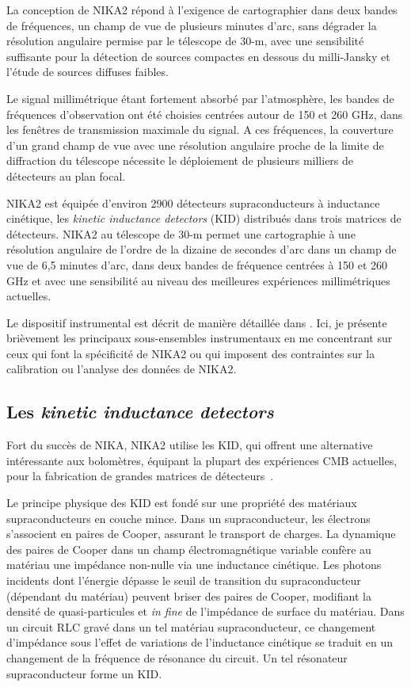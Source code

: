 La conception de NIKA2 répond à l'exigence de cartographier dans deux
bandes de fréquences, un champ de vue de plusieurs minutes d'arc, sans
dégrader la résolution angulaire permise par le télescope de 30-m,
avec une sensibilité suffisante pour la détection de sources compactes
en dessous du milli-Jansky et l'étude de sources diffuses faibles.

Le signal millimétrique étant fortement absorbé par l'atmosphère, les
bandes de fréquences d'observation ont été choisies centrées
autour de 150 et 260 GHz, dans les fenêtres de transmission maximale
du signal. A ces fréquences, la couverture d'un grand champ de vue
avec une résolution angulaire proche de la limite de diffraction du
télescope nécessite le déploiement de plusieurs milliers de détecteurs
au plan focal.

NIKA2 est équipée d'environ 2900 détecteurs supraconducteurs à inductance
cinétique, les \emph{kinetic inductance detectors} (KID) distribués
dans trois matrices de détecteurs. NIKA2 au télescope de 30-m permet
une cartographie à une résolution angulaire de l'ordre de la dizaine
de secondes d'arc dans un champ de vue de 6,5 minutes d'arc, dans deux
bandes de fréquence centrées à 150 et 260 GHz et avec une sensibilité
au niveau des meilleures expériences millimétriques actuelles.

Le dispositif instrumental est décrit de manière détaillée dans
\citet{Adam2018}. Ici, je présente brièvement les principaux
sous-ensembles instrumentaux en me concentrant sur ceux qui font la
spécificité de NIKA2 ou qui imposent des contraintes sur la
calibration ou l'analyse des données de NIKA2.


\subsection{Les \emph{kinetic inductance detectors}}
\label{se:kid}

Fort du succès de NIKA, NIKA2 utilise les KID, qui offrent une
alternative intéressante aux bolomètres, équipant la plupart des
expériences CMB actuelles, pour la fabrication de grandes matrices de
détecteurs~\citep{Day2003, Doyle2008_LEKID}. 

Le principe physique des KID est fondé sur une propriété des matériaux
supraconducteurs en couche mince. Dans un supraconducteur, les
électrons s'associent en paires de Cooper, assurant le transport de
charges. La dynamique des paires de Cooper dans un champ
électromagnétique variable confère au matériau une impédance non-nulle
via une inductance cinétique. Les photons incidents dont
l'énergie dépasse le seuil de transition du supraconducteur (dépendant
du matériau) peuvent briser des paires de Cooper, modifiant la densité
de quasi-particules et \emph{in fine} de l'impédance de surface du
matériau. Dans un circuit RLC gravé dans un tel matériau
supraconducteur, ce changement d'impédance sous l'effet de variations
de l'inductance cinétique se traduit en un changement
de la fréquence de résonance du circuit. Un tel résonateur
supraconducteur forme un KID. 

